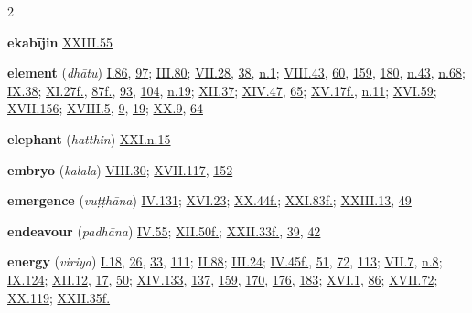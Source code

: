\begin{multicols}{2}
\begin{vismHanging}
\par\textbf{ekabījin} \hyperlink{XXIII.55}{XXIII.55}{}
\par\textbf{element} (\emph{dhātu}) \hyperlink{I.86}{I.86}{}, \hyperlink{I.97}{97}{}; \hyperlink{III.80}{III.80}{}; \hyperlink{VII.28}{VII.28}{}, \hyperlink{VII.38}{38}{}, \hyperlink{VII.n1}{n.1}{}; \hyperlink{VIII.43}{VIII.43}{}, \hyperlink{VIII.60}{60}{}, \hyperlink{VIII.159}{159}{}, \hyperlink{VIII.180}{180}{}, \hyperlink{VIII.n43}{n.43}{}, \hyperlink{VIII.n68}{n.68}{}; \hyperlink{IX.38}{IX.38}{}; \hyperlink{XI.27}{XI.27f.}{}, \hyperlink{XI.87}{87f.}{}, \hyperlink{XI.93}{93}{}, \hyperlink{XI.104}{104}{}, \hyperlink{XI.n19}{n.19}{}; \hyperlink{XII.37}{XII.37}{}; \hyperlink{XIV.47}{XIV.47}{}, \hyperlink{XIV.65}{65}{}; \hyperlink{XV.17}{XV.17f.}{}, \hyperlink{XV.n11}{n.11}{}; \hyperlink{XVI.59}{XVI.59}{}; \hyperlink{XVII.156}{XVII.156}{}; \hyperlink{XVIII.5}{XVIII.5}{}, \hyperlink{XVIII.9}{9}{}, \hyperlink{XVIII.19}{19}{}; \hyperlink{XX.9}{XX.9}{}, \hyperlink{XX.64}{64}{}
\par\textbf{elephant} (\emph{hatthin}) \hyperlink{XXI.n15}{XXI.n.15}{}
\par\textbf{embryo} (\emph{kalala}) \hyperlink{VIII.30}{VIII.30}{}; \hyperlink{XVII.117}{XVII.117}{}, \hyperlink{XVII.152}{152}{}
\par\textbf{emergence} (\emph{vuṭṭhāna}) \hyperlink{IV.131}{IV.131}{}; \hyperlink{XVI.23}{XVI.23}{}; \hyperlink{XX.44}{XX.44f.}{}; \hyperlink{XXI.83}{XXI.83f.}{}; \hyperlink{XXIII.13}{XXIII.13}{}, \hyperlink{XXIII.49}{49}{}
\par\textbf{endeavour} (\emph{padhāna}) \hyperlink{IV.55}{IV.55}{}; \hyperlink{XII.50}{XII.50f.}{}; \hyperlink{XXII.33}{XXII.33f.}{}, \hyperlink{XXII.39}{39}{}, \hyperlink{XXII.42}{42}{}
\par\textbf{energy} (\emph{viriya}) \hyperlink{I.18}{I.18}{}, \hyperlink{I.26}{26}{}, \hyperlink{I.33}{33}{}, \hyperlink{I.111}{111}{}; \hyperlink{II.88}{II.88}{}; \hyperlink{III.24}{III.24}{}; \hyperlink{IV.45}{IV.45f.}{}, \hyperlink{IV.51}{51}{}, \hyperlink{IV.72}{72}{}, \hyperlink{IV.113}{113}{}; \hyperlink{VII.7}{VII.7}{}, \hyperlink{VII.n8}{n.8}{}; \hyperlink{IX.124}{IX.124}{}; \hyperlink{XII.12}{XII.12}{}, \hyperlink{XII.17}{17}{}, \hyperlink{XII.50}{50}{}; \hyperlink{XIV.133}{XIV.133}{}, \hyperlink{XIV.137}{137}{}, \hyperlink{XIV.159}{159}{}, \hyperlink{XIV.170}{170}{}, \hyperlink{XIV.176}{176}{}, \hyperlink{XIV.183}{183}{}; \hyperlink{XVI.1}{XVI.1}{}, \hyperlink{XVI.86}{86}{}; \hyperlink{XVII.72}{XVII.72}{}; \hyperlink{XX.119}{XX.119}{}; \hyperlink{XXII.35}{XXII.35f.}{}

\end{vismHanging}
\end{multicols}
